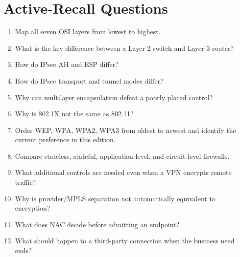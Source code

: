\documentclass[10pt,letterpaper]{article}
\begin{document}
\section{\color{navy}Active-Recall Questions}
\begin{enumerate}
\item Map all seven OSI layers from lowest to highest.
\item What is the key difference between a Layer 2 switch and Layer 3 router?
\item How do IPsec AH and ESP differ?
\item How do IPsec transport and tunnel modes differ?
\item Why can multilayer encapsulation defeat a poorly placed control?
\item Why is 802.1X not the same as 802.11?
\item Order WEP, WPA, WPA2, WPA3 from oldest to newest and identify the current preference in this edition.
\item Compare stateless, stateful, application-level, and circuit-level firewalls.
\item What additional controls are needed even when a VPN encrypts remote traffic?
\item Why is provider/MPLS separation not automatically equivalent to encryption?
\item What does NAC decide before admitting an endpoint?
\item What should happen to a third-party connection when the business need ends?
\end{enumerate}
\end{document}

